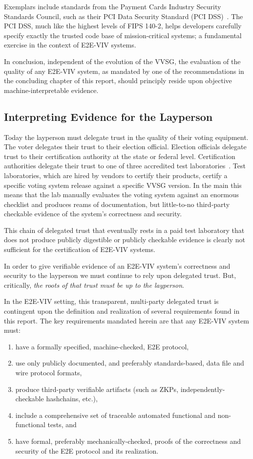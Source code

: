 Exemplars include standards from the Payment Cards Industry Security
Standards Council, such as their PCI Data Security Standard (PCI
DSS)~\cite{PCI-DSS}.  The PCI DSS, much like the highest levels of
FIPS 140-2, helps developers carefully specify exactly the trusted
code base of mission-critical systems; a fundamental exercise in the
context of E2E-VIV systems.

In conclusion, independent of the evolution of the VVSG, the evaluation
of the quality of any E2E-VIV system, as mandated by one of the
recommendations in the concluding chapter of this report, should
principly reside upon objective machine-interpretable evidence.

\subsection{Interpreting Evidence for the Layperson}

Today the layperson must delegate trust in the quality of their voting
equipment.  The voter delegates their trust to their election
official.  Election officials delegate trust to their certification
authority at the state or federal level.  Certification authorities
delegate their trust to one of three accredited test
laboratories~\cite{VVSG-labs}.  Test laboratories, which are hired by
vendors to certify their products, certify a specific voting system
release against a specific VVSG version. In the main this means that
the lab manually evaluates the voting system against an enormous
checklist and produces reams of documentation, but little-to-no
third-party checkable evidence of the system's correctness and
security.

This chain of delegated trust that eventually rests in a paid test
laboratory that does not produce publicly digestible or publicly
checkable evidence is clearly not sufficient for the certification of
E2E-VIV systems.

In order to give verifiable evidence of an E2E-VIV system's
correctness and security to the layperson we must continue to rely
upon delegated trust.  But, critically, \emph{the roots of that trust
  must be up to the layperson}.

In the E2E-VIV setting, this transparent, multi-party delegated trust
is contingent upon the definition and realization of several
requirements found in this report.  The key requirements mandated
herein are that any E2E-VIV system must:
\begin{enumerate}
\item have a formally specified, machine-checked, E2E protocol,
\item use only publicly documented, and preferably standards-based,
  data file and wire protocol formats,
\item produce third-party verifiable artifacts (such as ZKPs,
  independently-checkable hashchains, etc.),
\item include a comprehensive set of traceable automated functional
  and non-functional tests, and
\item have formal, preferably mechanically-checked, proofs of the
  correctness and security of the E2E protocol and its realization.
\end{enumerate}

